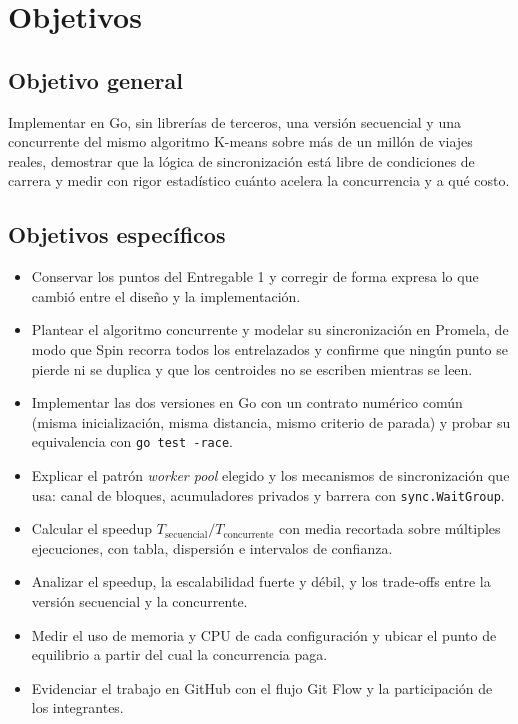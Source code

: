 \section{Objetivos}

\subsection{Objetivo general}

Implementar en Go, sin librerías de terceros, una versión secuencial y una concurrente del mismo
algoritmo K-means sobre más de un millón de viajes reales, demostrar que la lógica de sincronización
está libre de condiciones de carrera y medir con rigor estadístico cuánto acelera la concurrencia y
a qué costo.

\subsection{Objetivos específicos}

\begin{itemize}
  \item Conservar los puntos del Entregable 1 y corregir de forma expresa lo que cambió entre el
        diseño y la implementación.
  \item Plantear el algoritmo concurrente y modelar su sincronización en Promela, de modo que Spin
        recorra todos los entrelazados y confirme que ningún punto se pierde ni se duplica y que los
        centroides no se escriben mientras se leen.
  \item Implementar las dos versiones en Go con un contrato numérico común (misma inicialización,
        misma distancia, mismo criterio de parada) y probar su equivalencia con \texttt{go test -race}.
  \item Explicar el patrón \emph{worker pool} elegido y los mecanismos de sincronización que usa:
        canal de bloques, acumuladores privados y barrera con \texttt{sync.WaitGroup}.
  \item Calcular el speedup $T_{\text{secuencial}} / T_{\text{concurrente}}$ con media recortada
        sobre múltiples ejecuciones, con tabla, dispersión e intervalos de confianza.
  \item Analizar el speedup, la escalabilidad fuerte y débil, y los trade-offs entre la versión
        secuencial y la concurrente.
  \item Medir el uso de memoria y CPU de cada configuración y ubicar el punto de equilibrio a partir
        del cual la concurrencia paga.
  \item Evidenciar el trabajo en GitHub con el flujo Git Flow y la participación de los integrantes.
\end{itemize}
